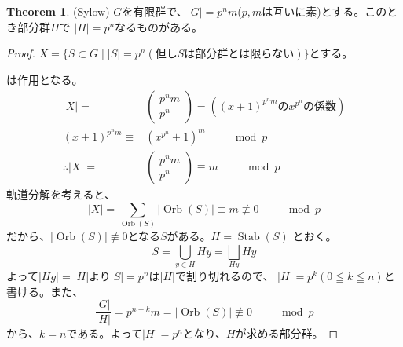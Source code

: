 \documentclass[dvipdfmx]{jsarticle}
\theoremstyle{definition}
\newtheorem{theorem}[definition]{Theorem}
\DeclareMathOperator{\Stab}{Stab}
\DeclareMathOperator{\Orb}{Orb}
\begin{document}
\begin{theorem}\label{sylow}(Sylow)
  $G$を有限群で、$|G|=p^nm$($p,m$は互いに素)とする。このとき部分群$H$で
  $|H|=p^n$なるものがある。 
\end{theorem}
\begin{proof}
  $X=\{S\subset G\mid |S|=p^n(\mathrm{但し}S\mathrm{は部分群とは限らない})\}$とする。
\begin{center}
\end{center}  
  は作用となる。
  \begin{align*}
                   |X|=&\left(
                              \begin{array}{c}
                                     p^nm\\
                                     p^n
                              \end{array}
                         \right)
                      =\left((x+1)^{p^nm}\mathrm{の}x^{p^n}\mathrm{の係数}\right) \\ 
    (x+1)^{p^nm}\equiv &(x^{p^{n}}+1)^m\qquad \mod p\\
    \therefore |X|=&\left(
                          \begin{array}{c}
                                  p^nm\\
                                  p^n
                          \end{array}
                    \right)
                  \equiv m\qquad \mod p
  \end{align*}
  軌道分解を考えると、\\
  \[|X|=\sum_{\Orb(S)}\left|\Orb(S)\right|\equiv m\not\equiv 0\qquad \mod p\]
  だから、$\left|\Orb(S)\right|\not\equiv 0$となる$S$がある。$H=\Stab(S)$
  とおく。
  \[S=\bigcup _{y\in H}Hy=\bigsqcup _{Hy}Hy\]
  よって$|Hg|=|H|$より$|S|=p^n$は$|H|$で割り切れるので、
  $|H|=p^k(0\leqq k\leqq n)$と書ける。また、
  \[\frac{|G|}{|H|}=p^{n-k}m
  =\left|\Orb(S)\right|\not\equiv0\qquad \mod p\]
  から、$k=n$である。よって$|H|=p^n$となり、$H$が求める部分群。
\end{proof}
\newpage
\end{document}
